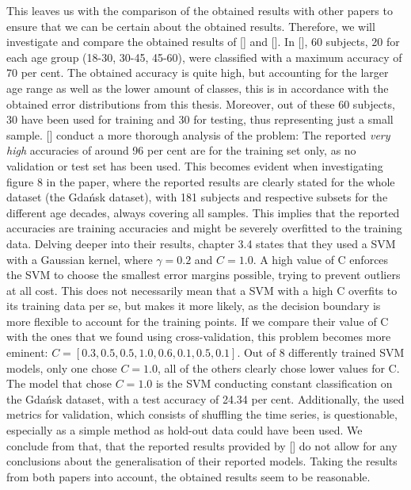 \documentclass[11pt]{scrartcl}
\begin{document}
This leaves us with the comparison of the obtained results with other papers to ensure that we can be certain about the obtained results. Therefore, we will investigate and compare the obtained results of [\cite{threeclassclassification}] and [\cite{patternshrd}]. In [\cite{threeclassclassification}], 60 subjects, 20 for each age group (18-30, 30-45, 45-60), were classified with a maximum accuracy of 70 per cent. The obtained accuracy is quite high, but accounting for the larger age range as well as the lower amount of classes, this is in accordance with the obtained error distributions from this thesis. Moreover, out of these 60 subjects, 30 have been used for training and 30 for testing, thus representing just a small sample. [\cite{patternshrd}] conduct a more thorough analysis of the problem: The reported \textit{very high} accuracies of around 96 per cent are for the training set only, as no validation or test set has been used. This becomes evident when investigating figure 8 in the paper, where the reported results are clearly stated for the whole dataset (the Gdańsk dataset), with 181 subjects and respective subsets for the different age decades, always covering all samples. This implies that the reported accuracies are training accuracies and might be severely overfitted to the training data. Delving deeper into their results, chapter 3.4 states that they used a SVM with a Gaussian kernel, where $\gamma = 0.2$ and $C=1.0$. A high value of C enforces the SVM to choose the smallest error margins possible, trying to prevent outliers at all cost. This does not necessarily mean that a SVM with a high C overfits to its training data per se, but makes it more likely, as the decision boundary is more flexible to account for the training points. If we compare their value of C with the ones that we found using cross-validation, this problem becomes more eminent: $C = [0.3, 0.5, 0.5, 1.0, 0.6, 0.1, 0.5, 0.1]$. Out of 8 differently trained SVM models, only one chose $C=1.0$, all of the others clearly chose lower values for C. The model that chose $C=1.0$ is the SVM conducting constant classification on the Gdańsk dataset, with a test accuracy of 24.34 per cent. Additionally, the used metrics for validation, which consists of shuffling the time series, is questionable, especially as a simple method as hold-out data could have been used. We conclude from that, that the reported results provided by [\cite{patternshrd}] do not allow for any conclusions about the generalisation of their reported models. Taking the results from both papers into account, the obtained results seem to be reasonable.
\end{document}
